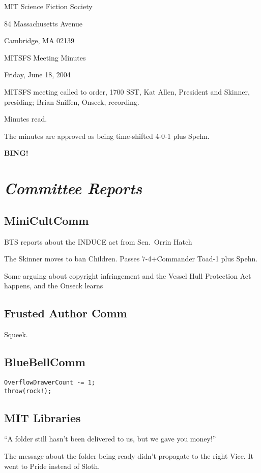 \documentclass[10pt]{article}
\newcommand{\bing}{{\bf BING!} }
\newcommand{\goto}[1]{\bing \vskip 12pt \section*{{\em{#1}}}}
\newcommand{\ps}{ plus Spehn\xspace}
\begin{document}
\begin{center}

MIT Science Fiction Society 

84 Massachusetts Avenue

Cambridge, MA 02139

\vspace{12pt}

MITSFS Meeting Minutes 

Friday, June 18, 2004

\end{center}
 
\vspace{18pt}

\setlength{\parskip}{6pt}

\noindent
MITSFS meeting called to order, 1700 SST, Kat Allen, President and
Skinner, presiding; Brian Sniffen,  Onseck, recording.

Minutes read.

The minutes are approved as being time-shifted 4-0-1\ps.

\goto{Committee Reports}
\subsection*{MiniCultComm}
BTS reports about the INDUCE act from Sen.\ Orrin Hatch

The Skinner moves to ban Children.  Passes 7-4+Commander Toad-1\ps.

Some arguing about copyright infringement and the Vessel Hull
Protection Act happens, and the Onseck learns 

\subsection*{Frusted Author Comm}
Squeek.

\subsection*{BlueBellComm}
\begin{verbatim}
OverflowDrawerCount -= 1;
throw(rock!);
\end{verbatim}

\subsection*{MIT Libraries}
``A folder still hasn't been delivered to us, but we gave you money!''

The message about the folder being ready didn't propagate to the right
Vice.  It went to Pride instead of Sloth.
\end{document}
